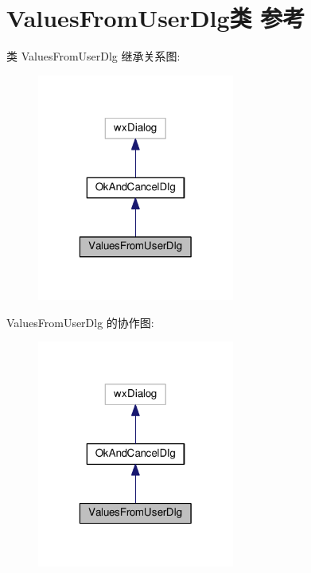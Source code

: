 \hypertarget{class_values_from_user_dlg}{\section{Values\+From\+User\+Dlg类 参考}
\label{class_values_from_user_dlg}
}


类 Values\+From\+User\+Dlg 继承关系图\+:
\nopagebreak
\begin{figure}[H]
\begin{center}
\leavevmode
\includegraphics[width=184pt]{class_values_from_user_dlg__inherit__graph}
\end{center}
\end{figure}


Values\+From\+User\+Dlg 的协作图\+:
\nopagebreak
\begin{figure}[H]
\begin{center}
\leavevmode
\includegraphics[width=184pt]{class_values_from_user_dlg__coll__graph}
\end{center}
\end{figure}
